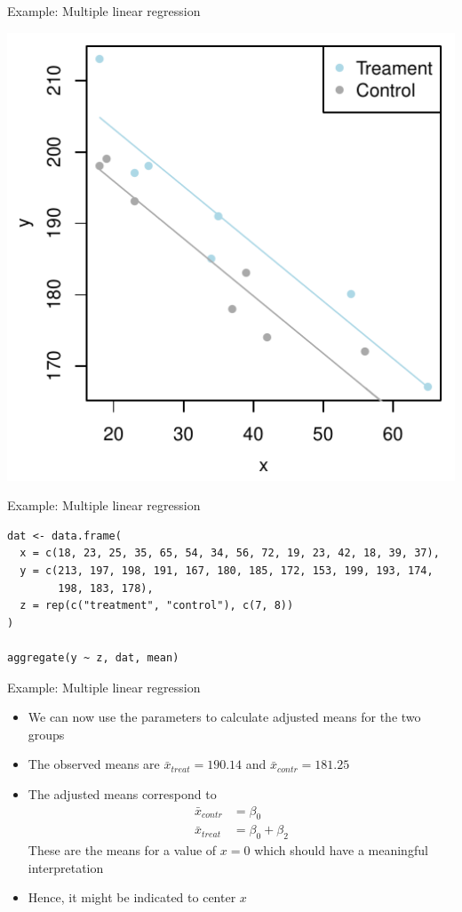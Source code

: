 \documentclass[aspectratio=169]{beamer}
\begin{document}
\begin{frame}[fragile]{Example: Multiple linear regression}
\begin{center}
\includegraphics[scale=.8]{../figures/ancova2}
\end{center}
\end{frame}

\begin{frame}[fragile]{Example: Multiple linear regression}
\begin{lstlisting}
dat <- data.frame(
  x = c(18, 23, 25, 35, 65, 54, 34, 56, 72, 19, 23, 42, 18, 39, 37),
  y = c(213, 197, 198, 191, 167, 180, 185, 172, 153, 199, 193, 174,
        198, 183, 178),
  z = rep(c("treatment", "control"), c(7, 8))
)

aggregate(y ~ z, dat, mean)
\end{lstlisting}
\end{frame}


\begin{frame}[fragile]{Example: Multiple linear regression}
  \begin{itemize}
    \item We can now use the parameters to calculate adjusted means for the
      two groups
    \item The observed means are $\bar x_{treat} = 190.14$ and $\bar
      x_{contr} = 181.25$
    \item The adjusted means correspond to
\begin{align*}
\bar x_{contr} & = \beta_0\\
\bar x_{treat} & = \beta_0 + \beta_2
\end{align*}
These are the means for a value of $x = 0$ which should have a meaningful
interpretation
\item Hence, it might be indicated to center $x$
  \end{itemize}
\end{frame}
\end{document}
